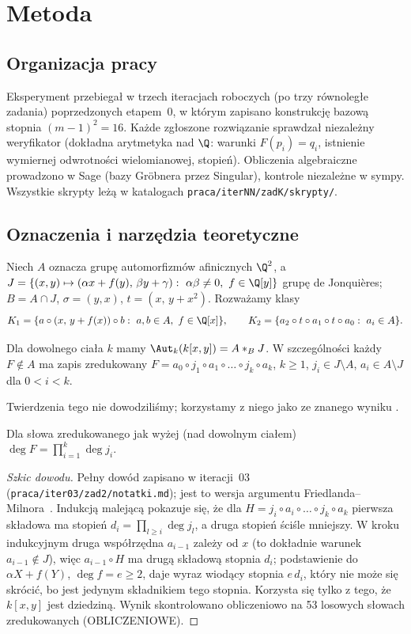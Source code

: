 \section{Metoda}

\subsection{Organizacja pracy}
Eksperyment przebiegał w trzech iteracjach roboczych (po trzy równoległe zadania) poprzedzonych
etapem~0, w którym zapisano konstrukcję bazową stopnia $(m-1)^2=16$. Każde zgłoszone
rozwiązanie sprawdzał niezależny weryfikator (dokładna arytmetyka nad $\Q$: warunki
$F(p_i)=q_i$, istnienie wymiernej odwrotności wielomianowej, stopień). Obliczenia
algebraiczne prowadzono w Sage (bazy Gröbnera przez Singular), kontrole niezależne w sympy.
Wszystkie skrypty leżą w katalogach \texttt{praca/iterNN/zadK/skrypty/}.

\subsection{Oznaczenia i narzędzia teoretyczne}
Niech $A$ oznacza grupę automorfizmów afinicznych $\Q^2$, a
$J=\{(x,y)\mapsto(\alpha x+f(y),\,\beta y+\gamma):\ \alpha\beta\neq0,\ f\in\Q[y]\}$ grupę
de Jonquières; $B=A\cap J$, $\sigma=(y,x)$, $t=(x,\,y+x^2)$. Rozważamy klasy
\[
K_1=\{a\circ(x,\,y+f(x))\circ b:\ a,b\in A,\ f\in\Q[x]\},\qquad
K_2=\{a_2\circ t\circ a_1\circ t\circ a_0:\ a_i\in A\}.
\]

\begin{twierdzenie}\label{tw:jvdk}
Dla dowolnego ciała $k$ mamy $\Aut_k(k[x,y])=A*_B J$. W szczególności każdy $F\notin A$
ma zapis zredukowany $F=a_0\circ j_1\circ a_1\circ\dots\circ j_k\circ a_k$, $k\ge1$,
$j_i\in J\setminus A$, $a_i\in A\setminus J$ dla $0<i<k$.
\end{twierdzenie}
Twierdzenia tego nie dowodziliśmy; korzystamy z niego jako ze znanego wyniku
\cite{vdEssen,vdKulk}.

\begin{twierdzenie}\label{tw:stopien}
Dla słowa zredukowanego jak wyżej (nad dowolnym ciałem) $\deg F=\prod_{i=1}^k\deg j_i$.
\end{twierdzenie}
\begin{proof}[Szkic dowodu]
Pełny dowód zapisano w iteracji~03 (\texttt{praca/iter03/zad2/notatki.md}); jest to wersja
argumentu Friedlanda--Milnora~\cite{FM}. Indukcją malejącą pokazuje się, że dla
$H=j_i\circ a_i\circ\dots\circ j_k\circ a_k$ pierwsza składowa ma stopień
$d_i=\prod_{l\ge i}\deg j_l$, a druga stopień ściśle mniejszy. W kroku indukcyjnym druga
współrzędna $a_{i-1}$ zależy od $x$ (to dokładnie warunek $a_{i-1}\notin J$), więc
$a_{i-1}\circ H$ ma drugą składową stopnia $d_i$; podstawienie do $\alpha X+f(Y)$, $\deg f=e\ge2$,
daje wyraz wiodący stopnia $e\,d_i$, który nie może się skrócić, bo jest jedynym
składnikiem tego stopnia. Korzysta się tylko z tego, że $k[x,y]$ jest dziedziną. Wynik
skontrolowano obliczeniowo na 53 losowych słowach zredukowanych (OBLICZENIOWE).
\end{proof}


